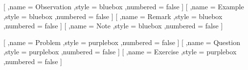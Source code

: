 {        %
        [
            ,name = Observation
            ,style = bluebox
            ,numbered = false
        ]
        [
            ,name = Example
            ,style = bluebox
            ,numbered = false
        ]
        [
            ,name = Remark
            ,style = bluebox
            ,numbered = false
        ]
        [
            ,name = Note
            ,style = bluebox
            ,numbered = false
        ]

        [
            ,name = Problem
            ,style = purplebox
            ,numbered = false
        ]
        [
            ,name = Question
            ,style = purplebox
            ,numbered = false
        ]
        [
            ,name = Exercise
            ,style = purplebox
            ,numbered = false
        ]


}
